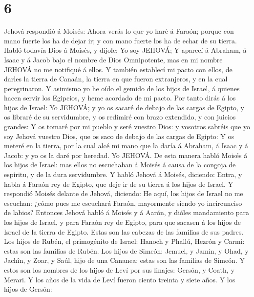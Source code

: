 \hypertarget{section-5}{%
\section{6}\label{section-5}}

 Jehová respondió á Moisés: Ahora verás lo que yo haré á
Faraón; porque con mano fuerte los ha de dejar ir; y con mano fuerte los
ha de echar de su tierra.  Habló todavía Dios á Moisés, y
díjole: Yo soy JEHOVÁ;  Y aparecí á Abraham, á Isaac y á
Jacob bajo el nombre de Dios Omnipotente, mas en mi nombre JEHOVÁ no me
notifiqué á ellos.  Y también establecí mi pacto con ellos,
de darles la tierra de Canaán, la tierra en que fueron extranjeros, y en
la cual peregrinaron.  Y asimismo yo he oído el gemido de
los hijos de Israel, á quienes hacen servir los Egipcios, y heme
acordado de mi pacto.  Por tanto dirás á los hijos de
Israel: Yo JEHOVÁ; y yo os sacaré de debajo de las cargas de Egipto, y
os libraré de su servidumbre, y os redimiré con brazo extendido, y con
juicios grandes:  Y os tomaré por mi pueblo y seré vuestro
Dios: y vosotros sabréis que yo soy Jehová vuestro Dios, que os saco de
debajo de las cargas de Egipto:  Y os meteré en la tierra,
por la cual alcé mi mano que la daría á Abraham, á Isaac y á Jacob: y yo
os la daré por heredad. Yo JEHOVÁ.  De esta manera habló
Moisés á los hijos de Israel: mas ellos no escuchaban á Moisés á causa
de la congoja de espíritu, y de la dura servidumbre.  Y
habló Jehová á Moisés, diciendo:  Entra, y habla á Faraón
rey de Egipto, que deje ir de su tierra á los hijos de Israel.
 Y respondió Moisés delante de Jehová, diciendo: He aquí,
los hijos de Israel no me escuchan: ¿cómo pues me escuchará Faraón,
mayormente siendo yo incircunciso de labios?  Entonces
Jehová habló á Moisés y á Aarón, y dióles mandamiento para los hijos de
Israel, y para Faraón rey de Egipto, para que sacasen á los hijos de
Israel de la tierra de Egipto.  Estas son las cabezas de
las familias de sus padres. Los hijos de Rubén, el primogénito de
Israel: Hanoch y Phallú, Hezrón y Carmi: estas son las familias de
Rubén.  Los hijos de Simeón: Jemuel, y Jamín, y Ohad, y
Jachîn, y Zoar, y Saúl, hijo de una Cananea: estas son las familias de
Simeón.  Y estos son los nombres de los hijos de Leví por
sus linajes: Gersón, y Coath, y Merari. Y los años de la vida de Leví
fueron ciento treinta y siete años.  Y los hijos de Gersón:
